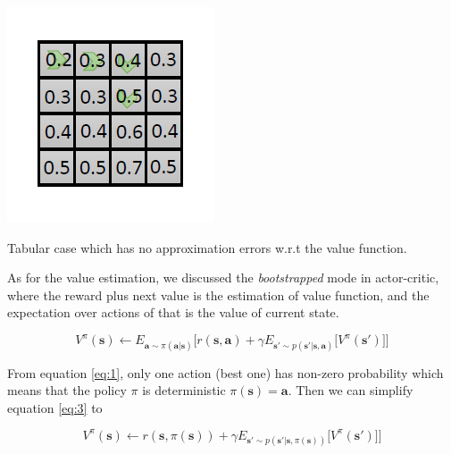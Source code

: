 \documentclass{tufte-handout}
\newcommand{\s}{\mathbf{s}}
\newcommand{\act}{\mathbf{a}}
\begin{document}
\begin{marginfigure}
\centering
\includegraphics[width=\linewidth]{grid}
\caption{Tabular case which has no approximation errors w.r.t the value function.}
\label{fig:grid}
\end{marginfigure}

As for the value estimation, we discussed the \emph{bootstrapped} mode in actor-critic, where the reward plus next value is the estimation of value function, and the expectation over actions of that is the value of current state.

\begin{equation}
\label{eq:3}
V^\pi(\s) \leftarrow E_{\act \sim \pi(\act | \s)} \big[ r(\s, \act) + \gamma E_{\s' \sim p(\s' | \s, \act)} \big[V^\pi (\s') \big] \big]
\end{equation}

From equation \ref{eq:1}, only one action (best one) has non-zero probability which means that the policy $\pi$ is deterministic $\pi(\s) = \act$. Then we can simplify equation \ref{eq:3} to

\begin{equation}
\label{eq:4}
V^\pi(\s) \leftarrow  r(\s, \pi(\s)) + \gamma E_{\s' \sim p(\s' | \s, \pi(\s))} \big[V^\pi (\s') \big] \big]
\end{equation}
\end{document}
